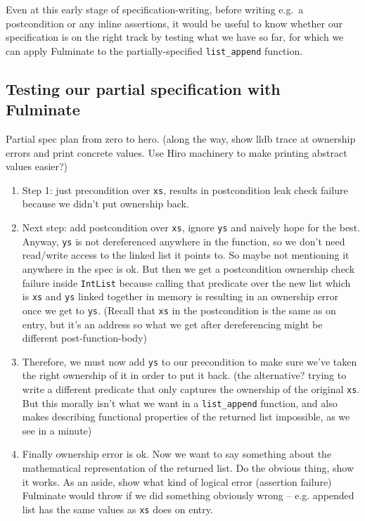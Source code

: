 Even at this early stage of specification-writing, before writing e.g.~a postcondition or any inline assertions, it would be useful to know whether our specification is on the right track by testing what we have so far, for which we can apply Fulminate to the partially-specified \texttt{list\_append} function.

\subsection{Testing our partial specification with Fulminate}

{\color{violet}
Partial spec plan from zero to hero. (along the way, show lldb trace at ownership errors and print concrete values. Use Hiro machinery to make printing abstract values easier?)

\begin{enumerate}
    \item Step 1: just precondition over \texttt{xs}, results in postcondition leak check failure because we didn't put ownership back.
    \item Next step: add postcondition over \texttt{xs}, ignore \texttt{ys} and naively hope for the best. Anyway, \texttt{ys} is not dereferenced anywhere in the function, so we don't need read/write access to the linked list it points to. So maybe not mentioning it anywhere in the spec is ok. But then we get a postcondition ownership check failure inside \texttt{IntList} because calling that predicate over the new list which is \texttt{xs} and \texttt{ys} linked together in memory is resulting in an ownership error once we get to \texttt{ys}. (Recall that \texttt{xs} in the postcondition is the same as on entry, but it's an address so what we get after dereferencing might be different post-function-body)
    \item Therefore, we must now add \texttt{ys} to our precondition to make sure we've taken the right ownership of it in order to put it back. (the alternative? trying to write a different predicate that only captures the ownership of the original \texttt{xs}. But this morally isn't what we want in a \texttt{list\_append} function, and also makes describing functional properties of the returned list impossible, as we see in a minute)
    \item Finally ownership error is ok. Now we want to say something about the mathematical representation of the returned list. Do the obvious thing, show it works. As an aside, show what kind of logical error (assertion failure) Fulminate would throw if we did something obviously wrong -- e.g. appended list has the same values as \texttt{xs} does on entry.
\end{enumerate}
}

